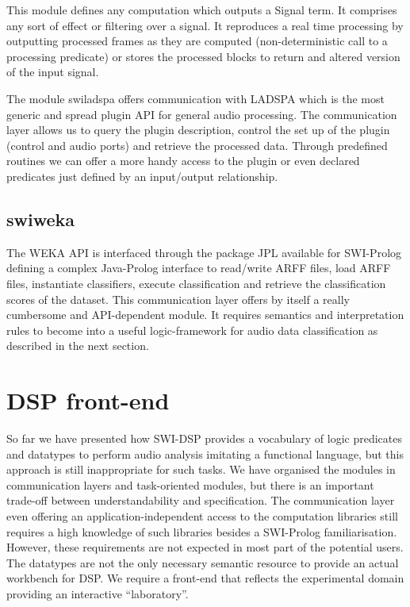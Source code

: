 \documentclass[runningheads]{llncs}
\begin{document}
This module defines any computation which outputs a Signal term. It comprises any sort of effect or filtering over a signal. It reproduces a real time processing by outputting processed frames as they are computed (non-deterministic call to a processing predicate) or stores the processed blocks to return and altered version of the input signal.

The module swiladspa offers communication with LADSPA which is the most generic and spread plugin API for general audio processing. The communication layer allows us to query the plugin description, control the set up of the plugin (control and audio ports) and retrieve the processed data. Through predefined routines we can offer a more handy access to the plugin or even declared predicates just defined by an input/output relationship.

\subsection{swiweka}\label{subsec:swiweka}

The WEKA API is interfaced through the package JPL available for SWI-Prolog defining a complex Java-Prolog interface to read/write ARFF files, load ARFF files, instantiate classifiers, execute classification and retrieve the classification scores of the dataset. This communication layer offers by itself a really cumbersome and API-dependent module. It requires semantics and interpretation rules to become into a useful logic-framework for audio data classification as described in the next section.

\section{DSP front-end}\label{sec:frontend}

So far we have presented how SWI-DSP provides a vocabulary of logic predicates and datatypes to perform audio analysis imitating a functional language, but this approach is still inappropriate for such tasks. We have organised the modules in communication layers and task-oriented modules, but there is an important trade-off between understandability and specification. The communication layer even offering an application-independent access to the computation libraries still requires a high knowledge of such libraries besides a SWI-Prolog familiarisation. However, these requirements are not expected in most part of the potential users. The datatypes are not the only necessary semantic resource to provide an actual workbench for DSP. We require a front-end that reflects the experimental domain providing an interactive ``laboratory''.
\end{document}
